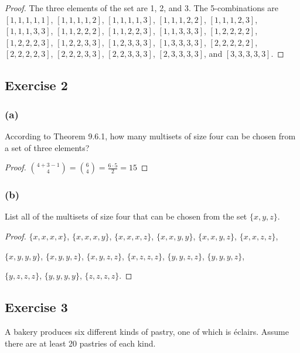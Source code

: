 \documentclass[14pt]{extarticle}
\begin{document}
\begin{proof}
     The three elements of the set are 1, 2, and 3. The 5-combinations are \([1, 1, 1, 1, 1]\), \([1, 1, 1, 1, 2]\),
     \([1, 1, 1, 1, 3]\), \([1, 1, 1, 2, 2]\), \([1, 1, 1, 2, 3]\), \([1, 1, 1, 3, 3]\), \([1, 1, 2, 2, 2]\), \([1, 1, 2, 2, 3]\),
     \([1, 1, 3, 3, 3]\), \([1, 2, 2, 2, 2]\), \([1, 2, 2, 2, 3]\), \([1, 2, 2, 3, 3]\), \([1, 2, 3, 3, 3]\), \([1, 3, 3, 3, 3]\),
     \([2, 2, 2, 2, 2]\), \([2, 2, 2, 2, 3]\), \([2, 2, 2, 3, 3]\), \([2, 2, 3, 3, 3]\), \([2, 3, 3, 3, 3]\), and
     \([3, 3, 3, 3, 3]\).
\end{proof}

\subsection{Exercise 2}
\subsubsection{(a)}
According to Theorem 9.6.1, how many multisets of size four can be chosen from a set of three elements?

\begin{proof}
     \(\binom{4+3-1}{4} = \binom{6}{4} = \frac{6 \cdot 5}{2} = 15\)
\end{proof}

\subsubsection{(b)}
List all of the multisets of size four that can be chosen from the set \(\{x, y, z\}\).

\begin{proof}
     \(\{x, x, x, x\}\), \(\{x, x, x, y\}\), \(\{x, x, x, z\}\),
     \(\{x, x, y, y\}\), \(\{x, x, y, z\}\), \(\{x, x, z, z\}\),

     \(\{x, y, y, y\}\), \(\{x, y, y, z\}\), \(\{x, y, z, z\}\),
     \(\{x, z, z, z\}\), \(\{y, y, z, z\}\), \(\{y, y, y, z\}\),

     \(\{y, z, z, z\}\), \(\{y, y, y, y\}\), \(\{z, z, z, z\}\).
\end{proof}

\subsection{Exercise 3}
A bakery produces six different kinds of pastry, one of which is éclairs. Assume there are at least 20 pastries of each
kind.
\end{document}
